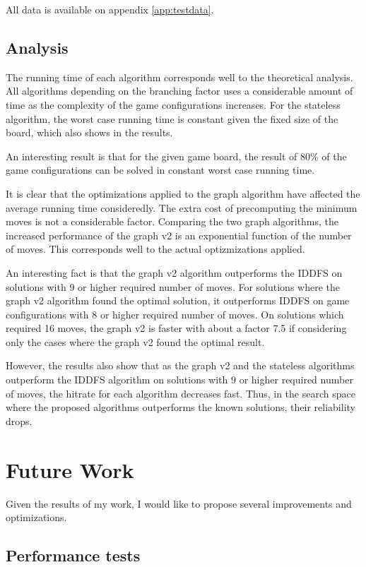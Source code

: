 \documentclass[]{article}
\begin{document}
All data is available on appendix \ref{app:testdata}.

\subsection{Analysis}\label{analysis-3}

The running time of each algorithm corresponds well to the theoretical
analysis. All algorithms depending on the branching factor uses a
considerable amount of time as the complexity of the game configurations
increases. For the stateless algorithm, the worst case running time is
constant given the fixed size of the board, which also shows in the
results.

An interesting result is that for the given game board, the result of
80\% of the game configurations can be solved in constant worst case
running time.

It is clear that the optimizations applied to the graph algorithm have
affected the average running time consideredly. The extra cost of
precomputing the minimum moves is not a considerable factor. Comparing
the two graph algorithms, the increased performance of the graph v2 is
an exponential function of the number of moves. This corresponds well to
the actual optizmizations applied.

An interesting fact is that the graph v2 algorithm outperforms the IDDFS
on solutions with 9 or higher required number of moves. For solutions
where the graph v2 algorithm found the optimal solution, it outperforms
IDDFS on game configurations with 8 or higher required number of moves.
On solutions which required 16 moves, the graph v2 is faster with about
a factor 7.5 if considering only the cases where the graph v2 found the
optimal result.

However, the results also show that as the graph v2 and the stateless
algorithms outperform the IDDFS algorithm on solutions with 9 or higher
required number of moves, the hitrate for each algorithm decreases fast.
Thus, in the search space where the proposed algorithms outperforms the
known solutions, their reliability drops.

\section{Future Work}\label{future-work}

Given the results of my work, I would like to propose several
improvements and optimizations.

\subsection{Performance tests}\label{performance-tests}
\end{document}
